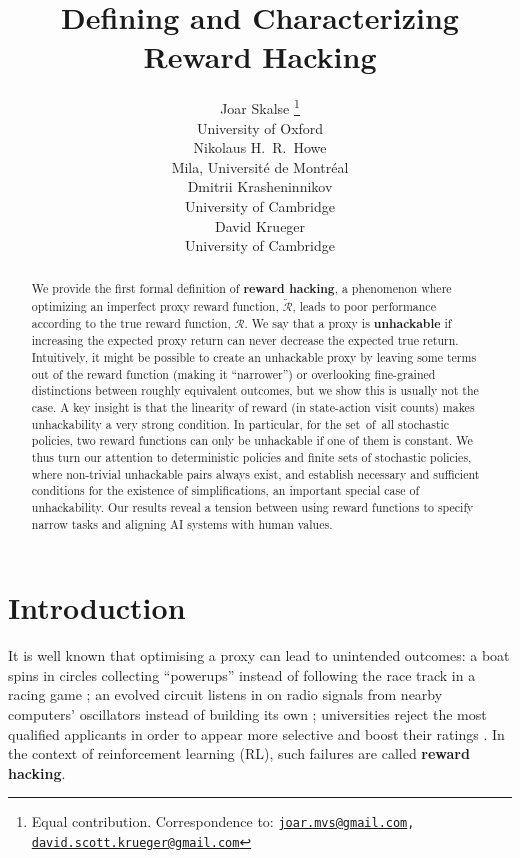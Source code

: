 \documentclass{article}
\title{Defining and Characterizing Reward Hacking}
\author{%
Joar Skalse%
\thanks{Equal contribution. Correspondence to: \texttt{\href{mailto:joar.mvs@gmail.com}{joar.mvs@gmail.com}, \href{mailto:david.scott.krueger@gmail.com}{david.scott.krueger@gmail.com}}}
\\
University of Oxford\\
\And
Nikolaus H.\ R.\ Howe \\
Mila, Universit\'e de Montr\'eal\\
\And
Dmitrii Krasheninnikov \\ 
University of Cambridge\\
\And
David Krueger%
\footnotemark[1] \\
University of Cambridge\\
}
\theoremstyle{definition}
\theoremstyle{remark}
\begin{document}
\maketitle



\begin{abstract}
We provide the first formal definition of \textbf{reward hacking}, a phenomenon where optimizing an imperfect proxy reward function, $\mathcal{\tilde{R}}$, leads to poor performance according to the true reward function, $\mathcal{R}$.  
We say that a proxy is \textbf{unhackable} if increasing the expected proxy return can never decrease the expected true return.
Intuitively, it might 
be possible
to create an unhackable proxy by leaving some terms out of the reward function (making it ``narrower'') or overlooking fine-grained distinctions between roughly equivalent outcomes,
but we show this is usually not the case.
A key insight is that the linearity of reward (in state-action visit counts) makes unhackability a very strong condition. 
In particular, for the set~of~all stochastic policies, two reward functions can only be unhackable if one of them is constant.
We thus turn our attention to deterministic policies and finite sets of stochastic policies, where non-trivial unhackable pairs always exist, and establish necessary and sufficient conditions for the existence of 
simplifications, an important special case of unhackability.
Our results reveal a tension between using reward functions to specify narrow tasks and aligning AI systems with human values.
\end{abstract}

\section{Introduction}
\setcounter{footnote}{0}


It is well known that optimising a proxy can lead to unintended outcomes: 
a boat spins in circles collecting ``powerups'' instead of following the race track in a racing game \citep{clark2016faulty}; 
an evolved circuit listens in on radio signals from nearby computers' oscillators instead of building its own \citep{bird2002evolved}; universities reject the most qualified applicants in order to appear more selective and boost their ratings \citep{golden2001glass}.
In the context of reinforcement learning (RL), such failures are called \textbf{reward hacking}.
\end{document}
